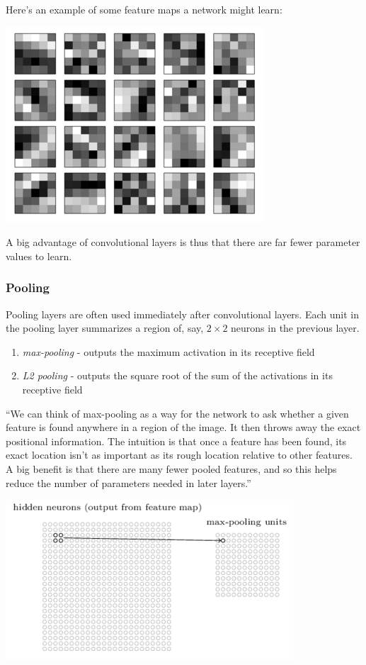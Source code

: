 \documentclass[12pt]{article}
\begin{document}
Here's an example of some feature maps a network might learn:

\includegraphics[scale=0.8]{feature-maps.png}

A big advantage of convolutional layers is thus that there are far fewer parameter values to learn.

\subsubsection*{Pooling}

Pooling layers are often used immediately after convolutional layers. Each unit in the pooling layer summarizes a region of, say, $2 \times 2$ neurons in the previous layer.

\begin{enumerate}
\item \textit{max-pooling} - outputs the maximum activation in its receptive field
\item \textit{L2 pooling} - outputs the square root of the sum of the activations in its receptive field
\end{enumerate}

``We can think of max-pooling as a way for the network to ask whether a given feature is found anywhere in a region of the image. It then throws away the exact positional information. The intuition is that once a feature has been found, its exact location isn't as important as its rough location relative to other features. A big benefit is that there are many fewer pooled features, and so this helps reduce the number of parameters needed in later layers.''

\includegraphics[scale=0.8]{pooling.png}
\end{document}
